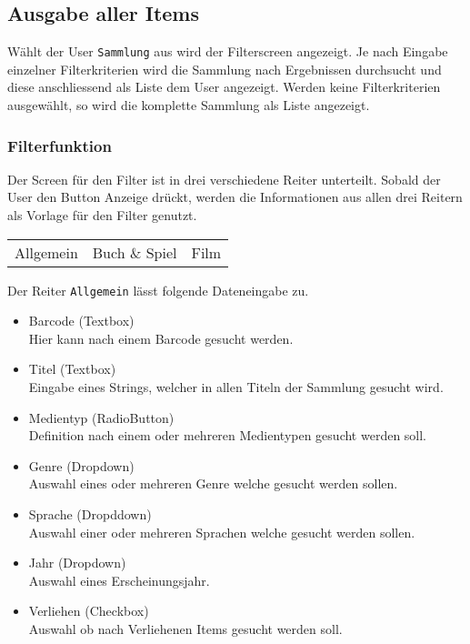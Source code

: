 \subsection{Ausgabe aller Items}

Wählt der User {\color{IndianRed}\texttt{Sammlung}} aus wird der Filterscreen angezeigt. Je nach Eingabe einzelner Filterkriterien wird die Sammlung nach Ergebnissen durchsucht und diese anschliessend als Liste dem User angezeigt. Werden keine Filterkriterien ausgewählt, so wird die komplette Sammlung als Liste angezeigt.

\subsubsection{Filterfunktion}

Der Screen für den Filter ist in drei verschiedene Reiter unterteilt. Sobald der User den Button Anzeige drückt, werden die Informationen aus allen drei Reitern als Vorlage für den Filter genutzt.

\begin{table}[h]
	\begin{center}
		\begin{tabular}{ccc}
			Allgemein & Buch \& Spiel & Film
		\end{tabular}
	\end{center}
\end{table}

Der Reiter {\color{IndianRed}\texttt{Allgemein}} lässt folgende Dateneingabe zu.

\begin{itemize}
	\item Barcode (Textbox) \\
		Hier kann nach einem Barcode gesucht werden.
	\item Titel (Textbox) \\
		Eingabe eines Strings, welcher in allen Titeln der Sammlung gesucht wird.
	\item Medientyp (RadioButton)\\
		Definition nach einem oder mehreren Medientypen gesucht werden soll.
	\item Genre (Dropdown)\\
		Auswahl eines oder mehreren Genre welche gesucht werden sollen.
	\item Sprache (Dropddown)\\
		Auswahl einer oder mehreren Sprachen welche gesucht werden sollen.
	\item Jahr (Dropdown) \\
		Auswahl eines Erscheinungsjahr.
	\item Verliehen (Checkbox) \\
		Auswahl ob nach Verliehenen Items gesucht werden soll.
\end{itemize} 

